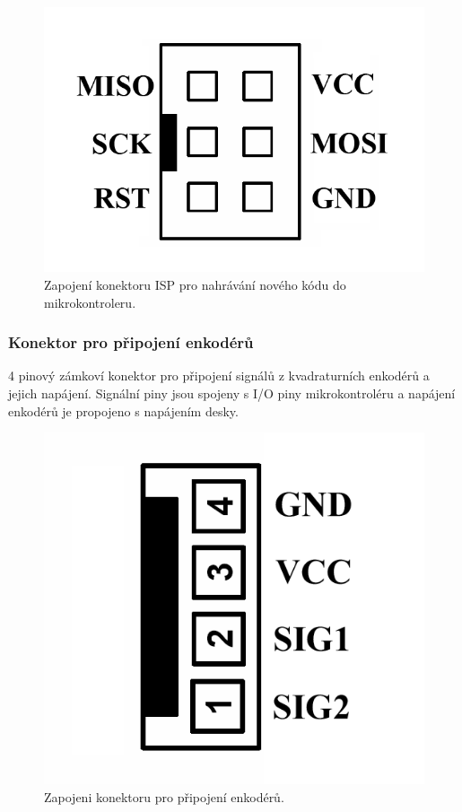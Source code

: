 \documentclass[a4paper,11pt]{article}
\begin{document}
\begin{figure}[htbp]
		\centering
			\includegraphics[scale=0.25]{KonektorISP.png}
		\caption{Zapojení konektoru ISP pro nahrávání nového kódu do mikrokontroleru.}
		\label{fig:KonektorISP}
	\end{figure}

\subsubsection{Konektor pro připojení enkodérů}
4 pinový zámkoví konektor pro připojení signálů z kvadraturních enkodérů a jejich napájení. Signální piny jsou spojeny s I/O piny mikrokontroléru a napájení enkodérů je propojeno s napájením desky.

\begin{figure}[htbp]
		\centering
			\includegraphics[scale=0.25]{KonektorEnkoder.png}
		\caption{Zapojeni konektoru pro připojení enkodérů.}
		\label{fig:KonektorEnkoder}
	\end{figure}
\end{document}
